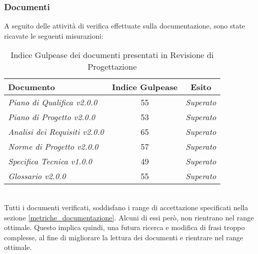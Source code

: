 \subsubsection{Documenti}
\label{docRP}
A seguito delle attività di verifica effettuate sulla documentazione, sono state ricavate le seguenti misurazioni:
\begin{table}[!h]
\begin{center}
		\begin{tabular}{|p{5cm}|c|c|}
			\hline
			\textbf{Documento} &
			\textbf{Indice Gulpease} &
			\textbf{Esito}\\ \hline
			\textit{Piano di Qualifica v2.0.0} & 55 &  \textit{\color{green}Superato} \\ 
			\textit{Piano di Progetto v2.0.0} & 53 & \textit{\color{green}Superato} \\ 
			\textit{Analisi dei Requisiti v2.0.0} & 65 & \textit{\color{green}Superato} \\ 
			\textit{Norme di Progetto v2.0.0} & 57 & \textit{\color{green}Superato} \\ 
			\textit{Specifica Tecnica v1.0.0} & 49 & \textit{\color{green}Superato} \\ 
			\textit{Glossario v2.0.0} & 55 & \textit{\color{green}Superato} \\ 
			\hline
		\end{tabular}
		\caption{Indice Gulpease dei documenti presentati in Revisione di Progettazione}
\end{center}
\end{table}
\\Tutti i documenti verificati, soddisfano i range di accettazione specificati nella sezione \ref{metriche_documentazione}. Alcuni di essi però, non rientrano nel range ottimale. Questo implica quindi, una futura ricerca e modifica di frasi troppo complesse, al fine di migliorare la lettura dei documenti e rientrare nel range ottimale.

